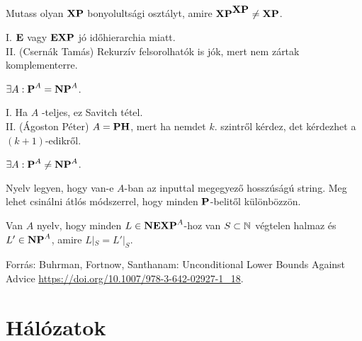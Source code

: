 \begin{Exercise}[counter={sorszam}, difficulty=0]
	Mutass olyan $\XP$ bonyolults\'agi oszt\'alyt, amire $\XP^{\XP}\ne \XP$.
\end{Exercise}	
\begin{Answer}
	I. $\E$ vagy $\EXP$ j\'o id\H ohierarchia miatt.\\
	II. (Csern\'ak Tam\'as) Rekurz\'iv felsorolhat\'ok is j\'ok, mert nem z\'artak komplementerre.
\end{Answer}


\begin{Exercise}[counter={sorszam}, difficulty=0]
	$\exists A: \P^A= \NP^A$.
\end{Exercise}	
\begin{Answer}
	I. Ha $A$ \PSPACE-teljes, ez Savitch t\'etel.\\
	II. (\'Agoston P\'eter) $A=\PH$, mert ha nemdet $k$. szintr\H ol k\'erdez, det k\'erdezhet a $(k+1)$-edikr\H ol.
\end{Answer}


\begin{Exercise}[counter={sorszam}, difficulty=1]
	$\exists A: \P^A\ne \NP^A$.
\end{Exercise}	
\begin{Answer}
	Nyelv legyen, hogy van-e $A$-ban az inputtal megegyez\H o hossz\'us\'ag\'u string.
	Meg lehet csin\'alni \'atl\'os m\'odszerrel, hogy minden $\P$-belit\H ol k\"ul\"onb\"ozz\"on.
\end{Answer}


\begin{Exercise}[counter={sorszam}, difficulty=1]
	Van $A$ nyelv, hogy minden $L\in \NEXP^A$-hoz van $S\subset \N$ v\'egtelen halmaz \'es $L'\in\NP^A$, amire $L|_S=L'|_S$.
\end{Exercise}	
\begin{Answer}
	Forr\'as: Buhrman, Fortnow, Santhanam: Unconditional Lower Bounds Against Advice \url{https://doi.org/10.1007/978-3-642-02927-1_18}.
\end{Answer}














\chapter{H\'al\'ozatok}

